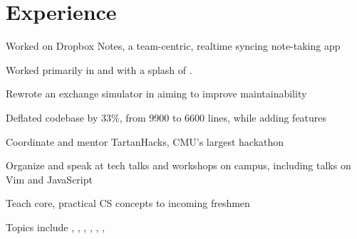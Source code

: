 \documentclass[]{deedy-resume-openfont}
\begin{document}
\hfill
\begin{minipage}[t]{0.66\textwidth}


\section{Experience}

\vspace{\topsep} %
\begin{tightemize}
\item Worked on Dropbox Notes, a team-centric, realtime syncing note-taking app
\item Worked primarily in  and  with a
  splash of .
\end{tightemize}
\sectionsep

\begin{tightemize}
\item Rewrote an exchange simulator in  aiming to improve
  maintainability
\item Deflated codebase by 33\%, from 9900 to 6600 lines, while adding features
\end{tightemize}
\sectionsep

\begin{tightemize}
\item Coordinate and mentor TartanHacks, CMU's largest hackathon
\item Organize and speak at tech talks and workshops on campus, including talks
  on Vim and JavaScript
\end{tightemize}
\sectionsep

\begin{tightemize}
\item Teach core, practical CS concepts to incoming freshmen
\item Topics include , ,
  , , , ,
\end{tightemize}
\sectionsep


\end{minipage}
\end{document}

